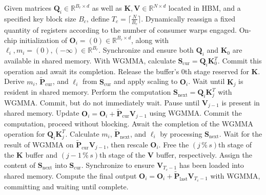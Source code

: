 \begin{algorithm}[H]
    \caption{\small\label{alg:flash3_wgmma}\textsc{FlashAttention-3} consumer warpgroup forward pass}
    \begin{algorithmic}[1]
      \REQUIRE  Given matrices $\mathbf{Q}_i \in \mathbb{R}^{B_r \times d}$ as well as $\mathbf{K}, \mathbf{V} \in \mathbb{R}^{N \times d}$ located in HBM, and a specified key block size $B_c$, define $T_c = \lceil \frac{N}{B_c} \rceil$.
      \STATE Dynamically reassign a fixed quantity of registers according to the number of consumer warps engaged.
      \STATE On-chip initialization of $\mathbf{O}_i = (0) \in \mathbb{R}^{B_r \times d}$, along with $\ell_i, m_i = (0), (-\infty) \in \mathbb{R}^{B_r}$.
      \STATE Synchronize and ensure both $\mathbf{Q}_i$ and $\mathbf{K}_0$ are available in shared memory.
      \STATE With WGMMA, calculate $\mathbf{S}_{\mathrm{cur}} = \mathbf{Q}_i \mathbf{K}_0^T$. Commit this operation and await its completion.
      \STATE Release the buffer’s $0$th stage reserved for $\mathbf{K}$.
      \STATE Derive $m_{i}$, $\tilde{\mathbf{P}}_{\mathrm{cur}}$, and $\ell_{i}$ from $\mathbf{S}_{\mathrm{cur}}$ and apply scaling to $\mathbf{O}_i$.
        \STATE Wait until $\mathbf{K}_j$ is resident in shared memory.
        \label{code:mainloop_start}
        \STATE Perform the computation $\mathbf{S}_{\mathrm{next}} = \mathbf{Q}_i \mathbf{K}_{j}^T$ with WGMMA. Commit, but do not immediately wait. \label{code:first_wgmma}
        \STATE Pause until $\mathbf{V}_{j-1}$ is present in shared memory.
        \STATE Update $\mathbf{O}_{i} = \mathbf{O}_{i} + \tilde{\mathbf{P}}_{\mathrm{cur}} \mathbf{V}_{j-1}$ using WGMMA. Commit the computation, proceed without blocking. \label{code:second_wgmma}
        \STATE Await the completion of the WGMMA operation for $\mathbf{Q}_i \mathbf{K}_{j}^T$.
        \STATE Calculate $m_{i}$, $\tilde{\mathbf{P}}_{\mathrm{next}}$, and $\ell_{i}$ by processing $\mathbf{S}_{\mathrm{next}}$. \label{code:softmax}
        \STATE Wait for the result of WGMMA on $\tilde{\mathbf{P}}_{\mathrm{cur}} \mathbf{V}_{j-1}$, then rescale $\mathbf{O}_i$.
        \STATE Free the $(j\,\%\,s)$th stage of the $\mathbf{K}$ buffer and $(j-1\,\%\,s)$th stage of the $\mathbf{V}$ buffer, respectively.
        \STATE Assign the content of $\mathbf{S}_{\mathrm{next}}$ into $\mathbf{S}_{\mathrm{cur}}$.
        \label{code:mainloop_end}
      \ENDFOR \STATE Synchronize to ensure $\mathbf{V}_{T_c - 1}$ has been loaded into shared memory.
      \STATE Compute the final output $\mathbf{O}_{i} = \mathbf{O}_{i} + \tilde{\mathbf{P}}_{\mathrm{last}} \mathbf{V}_{T_c - 1}$ with WGMMA, committing and waiting until complete.


\end{algorithmic}
\end{algorithm}
